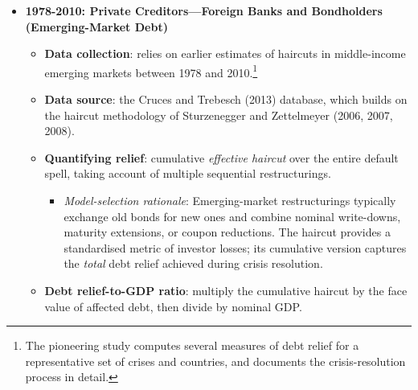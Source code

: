 \begin{itemize}
    \item \textbf{1978-2010: Private Creditors—Foreign Banks and Bondholders (Emerging-Market Debt)}%
        \begin{itemize}
            \item \textbf{Data collection}: relies on earlier estimates of haircuts in middle-income emerging markets between 1978 and 2010.\footnote{The pioneering study computes several measures of debt relief for a representative set of crises and countries, and documents the crisis-resolution process in detail.}
            \item \textbf{Data source}: the Cruces and Trebesch (2013) database, which builds on the haircut methodology of Sturzenegger and Zettelmeyer (2006, 2007, 2008).
            \item \textbf{Quantifying relief}: cumulative \emph{effective haircut} over the entire default spell, taking account of multiple sequential restructurings.
                \begin{itemize}
                    \item \emph{Model-selection rationale}: Emerging-market restructurings typically exchange old bonds for new ones and combine nominal write-downs, maturity extensions, or coupon reductions.  The haircut provides a standardised metric of investor losses; its cumulative version captures the \emph{total} debt relief achieved during crisis resolution.
                \end{itemize}
            \item \textbf{Debt relief-to-GDP ratio}: multiply the cumulative haircut by the face value of affected debt, then divide by nominal GDP.
        \end{itemize}
\end{itemize}


